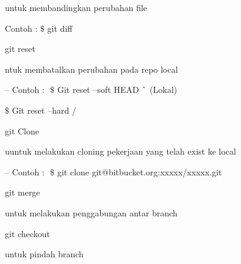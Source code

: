 \noindent 
\vspace{\baselineskip}
untuk membandingkan perubahan file \par
\noindent 
\vspace{\baselineskip}
Contoh :  $  \$  $ git diff \par
\noindent 
\vspace{\baselineskip}
git reset \par
\noindent 
\vspace{\baselineskip}
ntuk membatalkan perubahan pada repo local \par
\noindent 
\vspace{\baselineskip}
– Contoh : $  $ $  \$  $ Git reset --soft HEAD $  \string^  $ (Lokal) \par
\noindent 
\vspace{\baselineskip}
 $  \$  $ Git reset --hard / \par
\vspace{12pt}
\noindent 
git Clone \par
\noindent 
\vspace{\baselineskip}
uuntuk melakukan cloning pekerjaan yang telah exist ke local \par
\noindent 
\vspace{\baselineskip}
– Contoh : $  $ $  \$  $ git clone git@bitbucket.org:xxxxx/xxxxx.git \par
\vspace{12pt}
\noindent 
git merge $  $ \par
\noindent 
\vspace{\baselineskip}
untuk melakukan penggabungan antar branch \par
\vspace{12pt}
\noindent 
git checkout $  $ \par
\noindent 
\vspace{\baselineskip}
untuk pindah branch \par
\vspace{12pt}
\vspace{12pt}


